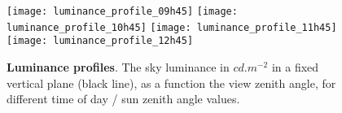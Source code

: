 \begin{figure}
\begin{center}
\texttt{[image: luminance\_profile\_09h45]}\vspace{-1.3cm}
\texttt{[image: luminance\_profile\_10h45]}\vspace{-1.3cm}
\texttt{[image: luminance\_profile\_11h45]}\vspace{-1.3cm}
\texttt{[image: luminance\_profile\_12h45]}\vspace{-0.5cm}
\end{center}
\caption{{\bf Luminance profiles}. The sky luminance in $cd.m^{-2}$ in a fixed
vertical plane (black line), as a function the view zenith angle, for different
time of day / sun zenith angle values.}\label{fig:luminance_profile}
\end{figure}

